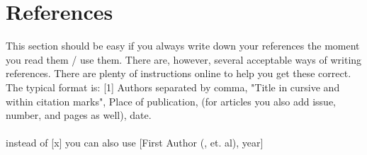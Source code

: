 \section{References}
This section should be easy if you always write down your references the moment you read them / use them. There are, however, several acceptable ways of writing references. There are plenty of instructions online to help you get these correct. The typical format is:
[1] Authors separated by comma, "Title in cursive and within citation marks", Place of publication, (for articles you also add issue, number, and pages as well), date.  
\\ \\ 
instead of [x] you can also use [First Author (, et. al), year]
